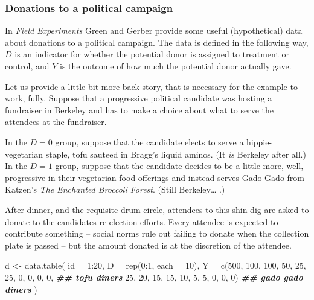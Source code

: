 \documentclass[
]{article}
\newenvironment{Shaded}{\begin{snugshade}}{\end{snugshade}}
\newcommand{\AttributeTok}[1]{\textcolor[rgb]{0.77,0.63,0.00}{#1}}
\newcommand{\DecValTok}[1]{\textcolor[rgb]{0.00,0.00,0.81}{#1}}
\newcommand{\DocumentationTok}[1]{\textcolor[rgb]{0.56,0.35,0.01}{\textbf{\textit{#1}}}}
\newcommand{\FunctionTok}[1]{\textcolor[rgb]{0.00,0.00,0.00}{#1}}
\newcommand{\NormalTok}[1]{#1}
\newcommand{\OtherTok}[1]{\textcolor[rgb]{0.56,0.35,0.01}{#1}}
\newcommand{\SpecialCharTok}[1]{\textcolor[rgb]{0.00,0.00,0.00}{#1}}
\begin{document}
\hypertarget{donations-to-a-political-campaign}{%
\subsubsection{Donations to a political campaign}\label{donations-to-a-political-campaign}}

In \emph{Field Experiments} Green and Gerber provide some useful (hypothetical) data about donations to a political campaign. The data is defined in the following way, \(D\) is an indicator for whether the potential donor is assigned to treatment or control, and \(Y\) is the outcome of how much the potential donor actually gave.

Let us provide a little bit more back story, that is necessary for the example to work, fully. Suppose that a progressive political candidate was hosting a fundraiser in Berkeley and has to make a choice about what to serve the attendees at the fundraiser.

In the \(D = 0\) group, suppose that the candidate elects to serve a hippie-vegetarian staple, tofu sauteed in Bragg's liquid aminos. (It \emph{is} Berkeley after all.) In the \(D=1\) group, suppose that the candidate decides to be a little more, well, progressive in their vegetarian food offerings and instead serves Gado-Gado from Katzen's \emph{The Enchanted Broccoli Forest}. (Still Berkeley\ldots{} .)

After dinner, and the requisite drum-circle, attendees to this shin-dig are asked to donate to the candidates re-election efforts. Every attendee is expected to contribute something -- social norms rule out failing to donate when the collection plate is passed -- but the amount donated is at the discretion of the attendee.

\begin{Shaded}
\begin{Highlighting}[]
\NormalTok{d }\OtherTok{\textless{}{-}} \FunctionTok{data.table}\NormalTok{(}
  \AttributeTok{id =} \DecValTok{1}\SpecialCharTok{:}\DecValTok{20}\NormalTok{, }
  \AttributeTok{D  =} \FunctionTok{rep}\NormalTok{(}\DecValTok{0}\SpecialCharTok{:}\DecValTok{1}\NormalTok{, }\AttributeTok{each =} \DecValTok{10}\NormalTok{), }
  \AttributeTok{Y =} \FunctionTok{c}\NormalTok{(}\DecValTok{500}\NormalTok{, }\DecValTok{100}\NormalTok{, }\DecValTok{100}\NormalTok{, }\DecValTok{50}\NormalTok{, }\DecValTok{25}\NormalTok{, }\DecValTok{25}\NormalTok{, }\DecValTok{0}\NormalTok{, }\DecValTok{0}\NormalTok{, }\DecValTok{0}\NormalTok{, }\DecValTok{0}\NormalTok{, }\DocumentationTok{\#\# tofu diners}
        \DecValTok{25}\NormalTok{,  }\DecValTok{20}\NormalTok{,  }\DecValTok{15}\NormalTok{,  }\DecValTok{15}\NormalTok{, }\DecValTok{10}\NormalTok{, }\DecValTok{5}\NormalTok{,  }\DecValTok{5}\NormalTok{, }\DecValTok{0}\NormalTok{, }\DecValTok{0}\NormalTok{, }\DecValTok{0}\NormalTok{)  }\DocumentationTok{\#\# gado gado diners}
\NormalTok{)}
\end{Highlighting}
\end{Shaded}
\end{document}
